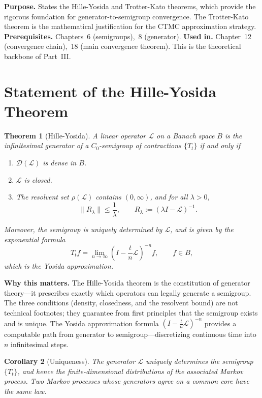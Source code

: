 \documentclass[11pt,a4paper,openany]{book}
\theoremstyle{definition}
\theoremstyle{plain}
\newtheorem{theorem}{Theorem}[chapter]
\newtheorem{corollary}[theorem]{Corollary}
\theoremstyle{remark}
\newcommand{\1}{\mathbbm{1}}
\newcommand{\calL}{\mathcal{L}}
\newcommand{\calD}{\mathcal{D}}
\begin{document}
\noindent\textbf{Purpose.} States the Hille-Yosida and Trotter-Kato theorems, which provide the rigorous foundation for generator-to-semigroup convergence. The Trotter-Kato theorem is the mathematical justification for the CTMC approximation strategy.
\textbf{Prerequisites.} Chapters~6 (semigroups),~8 (generator).
\textbf{Used in.} Chapter~12 (convergence chain),~18 (main convergence theorem). This is the theoretical backbone of Part~III.

\section{Statement of the Hille-Yosida Theorem}

\begin{theorem}[Hille-Yosida]
A linear operator $\calL$ on a Banach space $B$ is the infinitesimal generator of a $C_{0}$-semigroup of contractions $\{T_{t}\}$ if and only if
\begin{enumerate}[label=(\arabic*)]
    \item $\calD(\calL)$ is dense in $B$.
    \item $\calL$ is closed.
    \item The resolvent set $\rho(\calL)$ contains $(0, \infty)$, and for all $\lambda > 0$,
    \[
    \|R_{\lambda}\| \leq \frac{1}{\lambda}, \qquad R_{\lambda} := (\lambda I - \calL)^{-1}.
    \]
\end{enumerate}
Moreover, the semigroup is uniquely determined by $\calL$, and is given by the exponential formula
\[
T_{t} f = \lim_{n \to \infty} \left(I - \frac{t}{n}\calL\right)^{-n} f, \qquad f \in B,
\]
which is the Yosida approximation.
\end{theorem}

\medskip
\noindent\textbf{Why this matters.} The Hille-Yosida theorem is the constitution of generator theory---it prescribes exactly which operators can legally generate a semigroup. The three conditions (density, closedness, and the resolvent bound) are not technical footnotes; they guarantee from first principles that the semigroup exists and is unique. The Yosida approximation formula $(I - \frac{t}{n}\mathcal{L})^{-n}$ provides a computable path from generator to semigroup---discretizing continuous time into $n$ infinitesimal steps.

\begin{corollary}[Uniqueness]
The generator $\calL$ uniquely determines the semigroup $\{T_{t}\}$, and hence the finite-dimensional distributions of the associated Markov process. Two Markov processes whose generators agree on a common core have the same law.
\end{corollary}
\end{document}

